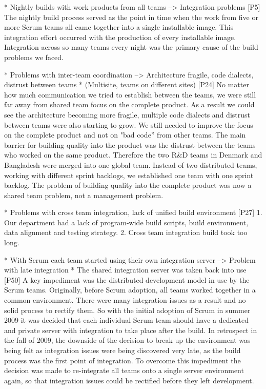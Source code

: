 \documentclass[preprint,authoryear,12pt]{elsarticle}
\begin{document}
* Nightly builds with work products from all teams --> Integration problems
[P5]
The nightly build process served as the point in time when the work from five or
more Scrum teams all came together into a single installable image.  This
integration effort occurred with the production of every installable image. 
Integration across so many teams every night was the primary cause of the build
problems we faced.


* Problems with inter-team coordination --> Architecture fragile, code dialects, distrust between teams
* (Multisite, teams on different sites)
[P24]
No matter how much communication we tried to establish between the teams, we
were still far away from shared team focus on the complete product. As a result
we could see the architecture becoming more fragile, multiple code dialects and
distrust between teams were also starting to grow.
We still needed to improve the focus on the complete product and not on "bad
code” from other teams. The main barrier for building quality into the product
was the distrust between the teams who worked on the same product. Therefore the
two R\&D teams in Denmark and Bangladesh were merged into one global team.
Instead of two distributed teams, working with different sprint backlogs, we
established one team with one sprint backlog. The problem of building quality
into the complete product was now a shared team problem, not a management
problem.


* Problems with cross team integration, lack of unified build environment
[P27]
1. Our department had a lack of program-wide build scripts, build environment,
   data alignment and testing strategy.
2. Cross team integration build took too long.


* With Scrum each team started using their own integration server --> Problem with late integration
* The shared integration server was taken back into use
[P50]
A key impediment was the distributed development model in use by the Scrum
teams. Originally, before Scrum adoption, all teams worked together in a common
environment. There were many integration issues as a result and no solid process
to rectify them. So with the initial adoption of Scrum in summer 2009 it was
decided that each individual Scrum team should have a dedicated and private
server with integration to take place after the build. In retrospect in the fall
of 2009, the downside of the decision to break up the environment was being felt
as integration issues were being discovered very late, as  the build process was
the first point of integration. To overcome this impediment the decision was
made to re-integrate all teams onto a single server environment again, so that
integration issues could be rectified before they left development.
\end{document}

